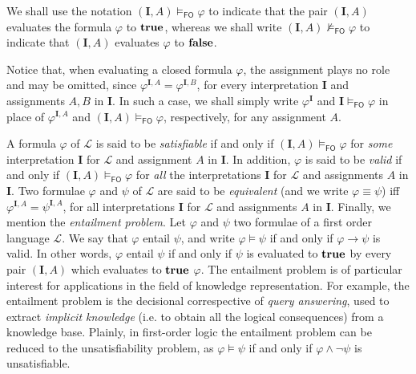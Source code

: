\documentclass[manyauthors]{fundam}
\newcommand{\Lang}{\ensuremath{\mathcal{L}\xspace}} %
\newcommand{\corr}[1]{#1}
\newcommand{\inter}{\ensuremath{\mathbf{I}}\xspace}
\newcommand{\fomodels}[2]{#1 \models_{\mathsf{FO}} #2}
\newcommand{\notfomodels}[2]{#1 \not\models_{\mathsf{FO}} #2}
\newcommand{\fosat}[1]{\fomodels{*}{#1}}
\begin{document}
\corr{We shall use the notation $\fomodels{(\inter, A)}{\varphi}$ to indicate
that the pair $(\inter, A)$ evaluates the formula $\varphi$ to $\mathbf{true}$,
whereas we shall write $\notfomodels{(\inter, A)}{\varphi}$ to indicate
that $(\inter, A)$ evaluates $\varphi$ to $\mathbf{false}$.}

Notice that, when evaluating a closed formula $\varphi$, the 
assignment plays no role and may be omitted, since $\varphi^{\inter, 
A} = \varphi^{\inter, B}$, for every interpretation $\inter$ and 
assignments $A,B$ in $\inter$. In such a case, we shall simply write 
$\varphi^{\inter}$
and $\fomodels{\inter}{\varphi}$ in place of $\varphi^{\inter, A}$ 
and $\fomodels{(\inter, A)}{\varphi}$, respectively, for any 
assignment $A$.


A formula $\varphi$ of $\Lang$ is said to be \emph{satisfiable}
if and only if $\fomodels{(\inter,A)}{\varphi}$ for \emph{some} interpretation
$\inter$ for $\Lang$ and assignment $A$ in $\inter$.
In addition, $\varphi$ is said to be \emph{valid} 
if and only if
$\fomodels{(\inter,A)}{\varphi}$ for \emph{all} the interpretations $\inter$
for $\Lang$ and assignments $A$ in $\inter$.
Two formulae $\varphi$ and $\psi$ of $\Lang$ are said to be
\emph{equivalent} (and we write $\varphi \equiv \psi$) iff 
$\varphi^{\inter,A} = \psi^{\inter,A}$,
for all interpretations $\inter$
for $\Lang$ and assignments $A$ in $\inter$. Finally, we mention
the \emph{entailment problem}.  Let $\varphi$ and
$\psi$ two formulae of a first order language $\Lang$. We say that $\varphi$ entail $\psi$, and
write $\varphi \models \psi$ if and only if $\varphi \rightarrow \psi$ is valid.
In other words, $\varphi$ entail $\psi$ if and only if $\psi$ is evaluated to
$\mathbf{true}$ by every pair $(\inter, A)$ which evaluates to $\mathbf{true}$
$\varphi$.
The entailment problem is of particular interest for applications in the field of knowledge
representation.
For example, the entailment problem is the decisional correspective of
\emph{query answering}, used to extract \emph{implicit knowledge}
(i.e. to obtain all the logical consequences) from a knowledge base.
Plainly, in first-order logic the entailment problem can be reduced to the
unsatisfiability problem, as $\varphi \models \psi$ if and only if $\varphi
\wedge \neg \psi$ is unsatisfiable.
\end{document}
